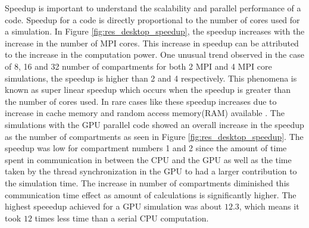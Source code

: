 \documentclass[review]{elsarticle}
\begin{document}
\begin{linenumbers}
Speedup is important to understand the scalability and 
parallel performance of a code. Speedup for a code is directly proportional 
to the number of cores used for a simulation. 
In Figure \ref{fig:res_desktop_speedup}, the speedup increases with the increase in 
the number of MPI cores. This increase in speedup can be attributed to the increase 
in the computation power. 
One unusual trend observed in the case of 8, 16 and 32 number of compartments for both 
2 MPI and 4 MPI core simulations, the speedup is higher than 2 and 4 respectively. 
This phenomena is known as super linear speedup which occurs 
when the speedup is greater than the number of cores used. In rare cases like these
speedup increases due to increase in cache memory and random access memory(RAM) 
available \citep{tuncer2009}. The simulations with the GPU parallel code showed an 
overall increase in the speedup as the number of compartments as seen in Figure 
\ref{fig:res_desktop_speedup}. The speedup was low for compartment numbers 1 and 2 
since the amount of time spent in communication in between the CPU and the GPU as well 
as the time taken by the thread synchronization in the GPU to had a larger 
contribution to the simulation time. The increase in number of compartments diminished 
this communication time effect as amount of calculations is significantly higher. The 
highest speeedup achieved for a GPU simulation was about $12.3$, which means it took 
$12$ times less time than a serial CPU computation. 



\end{linenumbers}
\end{document}
